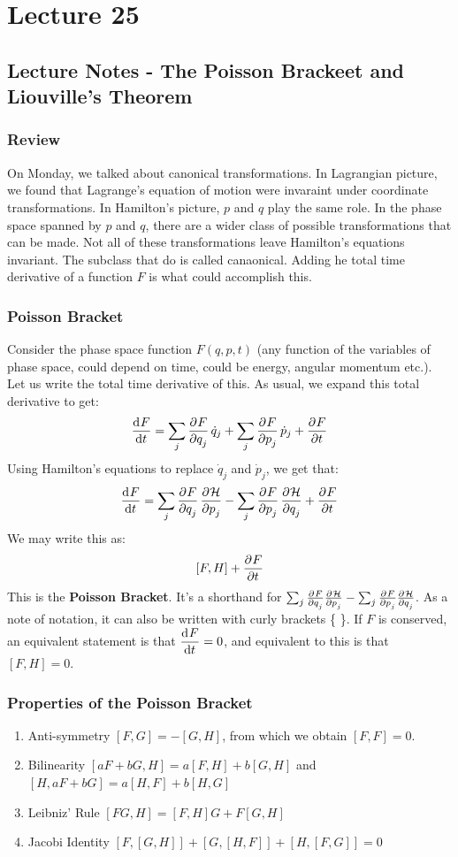 \documentclass[../PHYS306Notes.tex]{subfiles}
\begin{document}
\section{Lecture 25}
\subsection{Lecture Notes - The Poisson Brackeet and Liouville's Theorem}
\subsubsection{Review}
On Monday, we talked about canonical transformations. In Lagrangian picture, we found that Lagrange's equation of motion were invaraint under coordinate transformations. In Hamilton's picture, $p$ and $q$ play the same role. In the phase space spanned by $p$ and $q$, there are a wider class of possible transformations that can be made. Not all of these transformations leave Hamilton's equations invariant. The subclass that do is called canaonical. Adding he total time derivative of a function $F$ is what could accomplish this. 

\subsubsection{Poisson Bracket}
Consider the phase space function $F(q, p, t)$ (any function of the variables of phase space, could depend on time, could be energy, angular momentum etc.). Let us write the total time derivative of this. As usual, we expand this total derivative to get:
\[\dod{F}{t} = \sum_j \dpd{F}{q_j}\dot{q}_j + \sum_j\dpd{F}{p_j}\dot{p}_j + \dpd{F}{t}\]
Using Hamilton's equations to replace $\dot{q}_j$ and $\dot{p}_j$, we get that:
\[\dod{F}{t} = \sum_j\dpd{F}{q_j}\dpd{\HH}{p_j} - \sum_j\dpd{F}{p_j}\dpd{\HH}{q_j} + \dpd{F}{t}\]
We may write this as:
\[[F, H] + \dpd{F}{t}\]
This is the \textbf{Poisson Bracket}. It's a shorthand for $\sum_j\pd{F}{q_j}\pd{\HH}{p_j} - \sum_j\pd{F}{p_j}\pd{\HH}{q_j}$. As a note of notation, it can also be written with curly brackets \{ \}. If $F$ is conserved, an equivalent statement is that $\dod{F}{t} = 0$, and equivalent to this is that $[F, H] = 0$. 

\subsubsection{Properties of the Poisson Bracket}
\begin{enumerate}
    \item Anti-symmetry $[F, G] = -[G, H]$, from which we obtain $[F, F] = 0$.
    \item Bilinearity $[aF + bG, H] = a[F, H] + b[G, H]$ and $[H, aF + bG] = a[H, F] + b[H, G]$
    \item Leibniz' Rule $[FG, H] = [F, H]G + F[G, H]$
    \item Jacobi Identity $[F, [G, H]] + [G, [H, F]] + [H, [F, G]] = 0$
\end{enumerate}
\end{document}
